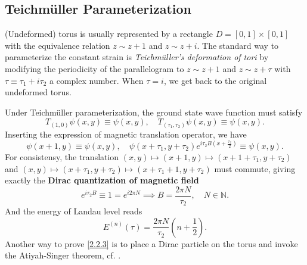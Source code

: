 \documentclass[10pt,nofootinbib,letterpaper]{revtex4}
\begin{document}
	\subsection{Teichm\"{u}ller Parameterization}
		(Undeformed) torus is usually represented by a rectangle $D=[0,1]\times[0,1]$ with the equivalence relation $z\sim z+1$ and $z\sim z+i$. The standard way to parameterize the constant strain is \emph{Teichm\"{u}ller's deformation of tori} by modifying the periodicity of the parallelogram to $z\sim z+1$ and $z\sim z+\tau$ with $\tau\equiv\tau_1+i\tau_2$ a complex number. When $\tau=i$, we get back to the original undeformed torus.\par
		Under Teichm\"{u}ller parameterization, the ground state wave function must satisfy
		\begin{equation}\label{2.2.1}
			T_{(1,0)}\psi(x,y)\equiv\psi(x,y),\quad T_{(\tau_1,\tau_2)}\psi(x,y)\equiv\psi(x,y).
		\end{equation}
		Inserting the expression of magnetic translation operator, we have
		\begin{equation}\label{2.2.2}
			\psi(x+1,y)\equiv\psi(x,y),\quad \psi(x+\tau_1,y+\tau_2)e^{i\tau_2B(x+\frac{\tau_2}{2})}\equiv\psi(x,y).
		\end{equation}
		For consistensy, the translation $(x,y)\mapsto(x+1,y)\mapsto(x+1+\tau_1,y+\tau_2)$ and $(x,y)\mapsto(x+\tau_1,y+\tau_2)\mapsto(x+\tau_1+1,y+\tau_2)$ must commute, giving exactly the \textbf{Dirac quantization of magnetic field} 
		\begin{equation}\label{2.2.3}
			e^{i\tau_2B}\equiv1=e^{i2\pi N}\implies B=\dfrac{2\pi N}{\tau_2},\quad N\in\mathbb{N}.
		\end{equation}
		And the energy of Landau level reads
		\begin{equation}\label{2.2.4}
			E^{(n)}(\tau)=\dfrac{2\pi N}{\tau_2}\left(n+\dfrac{1}{2}\right).
		\end{equation}
		Another way to prove \eqref{2.2.3} is to place a Dirac particle on the torus and invoke the Atiyah-Singer theorem, cf. \cite{levay1995berry}.\par
\end{document}
